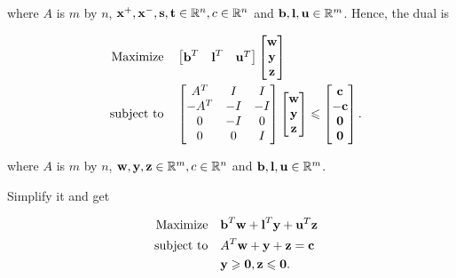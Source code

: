 \documentclass[12pt]{article}
\begin{document}
\begin{enumerate}
where $A$ is $m$ by $n$, $\textbf x^+, \textbf x^-, \textbf s, \textbf t \in\mathbb R^n, c\in\mathbb R^n $ and $\textbf b, \textbf l, \textbf u\in \mathbb R^m$.
Hence, the dual is 

\begin{equation}\label{p5c_dual}
\begin{aligned}
\quad \text{Maximize} \quad & \begin{bmatrix}
\textbf b^T & \textbf l^T & \textbf u^T
\end{bmatrix}\begin{bmatrix}
\textbf w \\ \textbf y \\ \textbf z
\end{bmatrix}\\
\text{subject\  to} \quad &\begin{bmatrix}
A^T & I & I \\
-A^T & -I & -I \\
0 & -I & 0 \\
0 & 0 & I
\end{bmatrix}
\begin{bmatrix}
\textbf w \\ \textbf y \\ \textbf z
\end{bmatrix} \leqslant \begin{bmatrix}
\textbf c \\ -\textbf c \\ \textbf 0 \\ \textbf 0
\end{bmatrix}.
\end{aligned}
\end{equation}

where $A$ is $m$ by $n$, $\textbf w, \textbf y, \textbf z \in\mathbb R^m, c\in\mathbb R^n $ and $\textbf b, \textbf l, \textbf u\in \mathbb R^m$.

Simplify it and get

\begin{equation}\label{p5c_dual_simple}
\begin{aligned}
 \quad \text{Maximize} \quad & \textbf b^T\textbf w + \textbf l^T\textbf y + \textbf u^T\textbf z\\
\text{subject\  to} \quad & A^T\textbf w + \textbf y + \textbf z  = \textbf c \\
& \textbf y \geqslant \textbf 0, \textbf z \leqslant \textbf 0.
\end{aligned}
\end{equation}

\end{enumerate}
\end{document}
